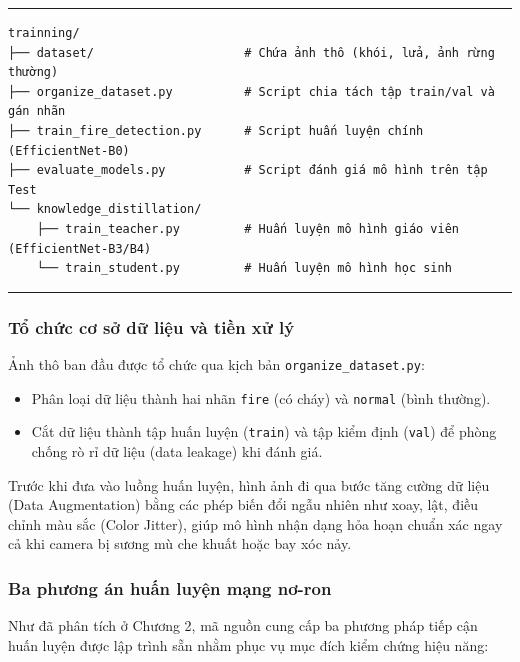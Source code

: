 \documentclass[12pt,a4paper]{report}
\begin{document}
\begin{table}[htbp]
  \centering
  \caption{Cấu trúc thư mục huấn luyện mô hình}
  \label{code:trainning_dir}
  \hrule
  \vspace{2mm}
  \begin{minipage}{0.9\textwidth}
    \small
\begin{verbatim}
trainning/
├── dataset/                     # Chứa ảnh thô (khói, lửa, ảnh rừng thường)
├── organize_dataset.py          # Script chia tách tập train/val và gán nhãn
├── train_fire_detection.py      # Script huấn luyện chính (EfficientNet-B0)
├── evaluate_models.py           # Script đánh giá mô hình trên tập Test
└── knowledge_distillation/
    ├── train_teacher.py         # Huấn luyện mô hình giáo viên (EfficientNet-B3/B4)
    └── train_student.py         # Huấn luyện mô hình học sinh
\end{verbatim}
  \end{minipage}
  \vspace{2mm}
  \hrule
\end{table}

\subsubsection{Tổ chức cơ sở dữ liệu và tiền xử lý}

Ảnh thô ban đầu được tổ chức qua kịch bản \texttt{organize\_dataset.py}:
\begin{itemize}
  \item Phân loại dữ liệu thành hai nhãn \texttt{fire} (có cháy) và \texttt{normal} (bình thường).
  \item Cắt dữ liệu thành tập huấn luyện (\texttt{train}) và tập kiểm định (\texttt{val}) để phòng chống rò rỉ dữ liệu (data leakage) khi đánh giá.
\end{itemize}

Trước khi đưa vào luồng huấn luyện, hình ảnh đi qua bước tăng cường dữ liệu (Data Augmentation) bằng các phép biến đổi ngẫu nhiên như xoay, lật, điều chỉnh màu sắc (Color Jitter), giúp mô hình nhận dạng hỏa hoạn chuẩn xác ngay cả khi camera bị sương mù che khuất hoặc bay xóc nảy.

\subsubsection{Ba phương án huấn luyện mạng nơ-ron}

Như đã phân tích ở Chương 2, mã nguồn cung cấp ba phương pháp tiếp cận huấn luyện được lập trình sẵn nhằm phục vụ mục đích kiểm chứng hiệu năng:
\end{document}
